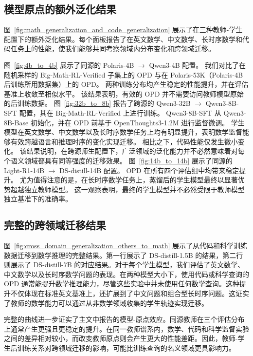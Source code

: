 \subsection{模型原点的额外泛化结果}
\label{sec:appendix_additional_generalization}


图~\ref{fig:math_generalization_and_code_generalization} 展示了在三种教师-学生配置下的额外泛化结果。每个面板报告了在英文数学、中文数学、长时序数学和代码任务上的性能，使我们能够共同考察领域内分布变化和跨领域迁移。

图~\ref{fig:4b_to_4b} 展示了同源的 Polaris-4B $\rightarrow$ Qwen3-4B 配置。  
我们对比了在随机采样的 Big-Math-RL-Verified 子集上的 OPD 与在 Polaris-53K（Polaris-4B 后训练所用数据集）上的 OPD。  
两种训练分布均产生稳定的性能提升，并在评估基准上收敛至相似水平。  
该结果表明，有效的 OPD 并不需要访问教师模型原始的后训练数据。  
图~\ref{fig:32b_to_8b} 报告了跨源的 Qwen3-32B $\rightarrow$ Qwen3-8B-SFT 配置，其在 Big-Math-RL-Verified 上进行训练。  
Qwen3-8B-SFT 从 Qwen3-8B-Base 初始化，并在 OPD 前基于 OpenThoughts3-1.2M 进行监督微调。  
学生模型在英文数学、中文数学以及长时序数学任务上均有明显提升，表明数学监督能够有效跨越语言和推理时序的变化实现迁移。  
相比之下，代码性能仅发生微小变化。  
该结果说明，在跨源师生配置下，广泛领域的泛化能力并不必然意味着对每个语义领域都具有同等强度的迁移效果。  
图~\ref{fig:14b_to_14b} 展示了同源的 Light-R1-14B $\rightarrow$ DS-distill-14B 配置。  
OPD 在所有四个评估组中均带来稳定提升。  
尤为值得注意的是，在长时序数学任务上，蒸馏后的学生模型最终以显著优势超越独立教师模型。  
这一观察表明，最终的学生模型并不必然受限于教师模型独立基准下的准确率。

\subsection{完整的跨领域迁移结果}
\label{sec:appendix_complete_others_to_math}

图~\ref{fig:cross_domain_generalization_others_to_math} 展示了从代码和科学训练数据迁移到数学推理的完整结果。第一行展示了 DS-distill-1.5B 的结果，第二行则展示了 DS-distill-7B 的对应结果。对于每个学生模型，我们评估了英文数学、中文数学以及长时序数学问题的表现。在两种模型大小下，使用代码或科学查询的 OPD 通常能提升数学推理能力，尽管这些实验中并未使用任何数学查询。这种提升不仅体现在标准英文基准上，还扩展到了中文问题和组合型长时序问题。这证实了教师的数学能力可以通过从非数学领域收集的学生轨迹实现迁移。

完整的曲线进一步证实了主文中报告的模型-原点效应。同源教师在三个评估分布上通常产生更强且更稳定的提升。在同一教师谱系内，数学、代码和科学监督实验之间的差异相对较小，而改变教师原点则会产生更大的性能差距。因此，教师-学生后训练关系对跨领域迁移的影响，可能比训练查询的名义领域更具影响力。

